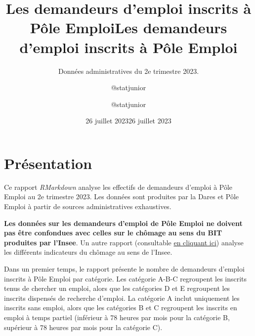 \documentclass[
  paper=a4,
  ,captions=tableheading
]{scrartcl}
\title{Les demandeurs d'emploi inscrits à Pôle Emploi}
\subtitle{Données administratives du 2e trimestre 2023.}
\author{@statjunior}
\date{26 juillet 2023}
\title{Les demandeurs d'emploi inscrits à Pôle Emploi}
\author{@statjunior}
\date{26 juillet 2023}
\begin{document}
\begin{titlepage}
\afterpage{\restorepagecolor}
\newcommand{\colorRule}[3][black]{\textcolor[HTML]{#1}{\rule{#2}{#3}}}
\end{titlepage}
\restoregeometry
{} 




\hypertarget{pruxe9sentation}{%
\section{Présentation}\label{pruxe9sentation}}

Ce rapport \emph{RMarkdown} analyse les effectifs de demandeurs d'emploi
à Pôle Emploi au 2e trimestre 2023. Les données sont produites par la
Dares et Pôle Emploi à partir de sources administratives exhaustives.

\textbf{Les données sur les demandeurs d'emploi de Pôle Emploi ne
doivent pas être confondues avec celles sur le chômage au sens du BIT
produites par l'Insee}. Un autre rapport (consultable
\href{https://github.com/statjunior/Statjunior/tree/main/March\%C3\%A9\%20du\%20travail\%20et\%20ch\%C3\%B4mage/Ch\%C3\%B4mage\%20BIT\%2C\%20halo\%20et\%20sous\%20emploi\%20-\%20Enqu\%C3\%AAte\%20Emploi/}{en
cliquant ici}) analyse les différents indicateurs du chômage au sens de
l'Insee.

Dans un premier temps, le rapport présente le nombre de demandeurs
d'emploi inscrits à Pôle Emploi par catégorie. Les catégorie A-B-C
regroupent les inscrits tenus de chercher un emploi, alors que les
catégories D et E regroupent les inscrits dispensés de recherche
d'emploi. La catégorie A inclut uniquement les inscrits sans emploi,
alors que les catégories B et C regroupent les inscrits en emploi à
temps partiel (inférieur à 78 heures par mois pour la catégorie B,
supérieur à 78 heures par mois pour la catégorie C).
\end{document}

